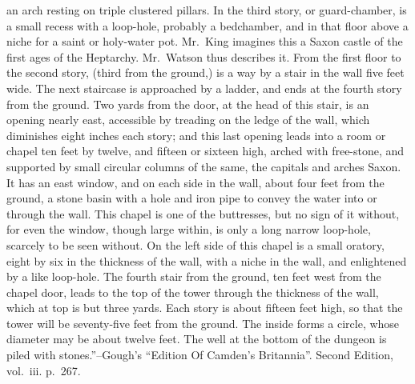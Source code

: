an arch resting on triple clustered pillars. In the third story, or
guard-chamber, is a small recess with a loop-hole, probably a
bedchamber, and in that floor above a niche for a saint or holy-water
pot. Mr.~King imagines this a Saxon castle of the first ages of the
Heptarchy. Mr.~Watson thus describes it. From the first floor to the
second story, (third from the ground,) is a way by a stair in the wall
five feet wide. The next staircase is approached by a ladder, and ends
at the fourth story from the ground. Two yards from the door, at the
head of this stair, is an opening nearly east, accessible by treading on
the ledge of the wall, which diminishes eight inches each story; and
this last opening leads into a room or chapel ten feet by twelve, and
fifteen or sixteen high, arched with free-stone, and supported by small
circular columns of the same, the capitals and arches Saxon. It has an
east window, and on each side in the wall, about four feet from the
ground, a stone basin with a hole and iron pipe to convey the water into
or through the wall. This chapel is one of the buttresses, but no sign
of it without, for even the window, though large within, is only a long
narrow loop-hole, scarcely to be seen without. On the left side of this
chapel is a small oratory, eight by six in the thickness of the wall,
with a niche in the wall, and enlightened by a like loop-hole. The
fourth stair from the ground, ten feet west from the chapel door, leads
to the top of the tower through the thickness of the wall, which at top
is but three yards. Each story is about fifteen feet high, so that the
tower will be seventy-five feet from the ground. The inside forms a
circle, whose diameter may be about twelve feet. The well at the bottom
of the dungeon is piled with stones.''--Gough's ``Edition Of Camden's
Britannia''. Second Edition, vol.~iii. p.~267.
